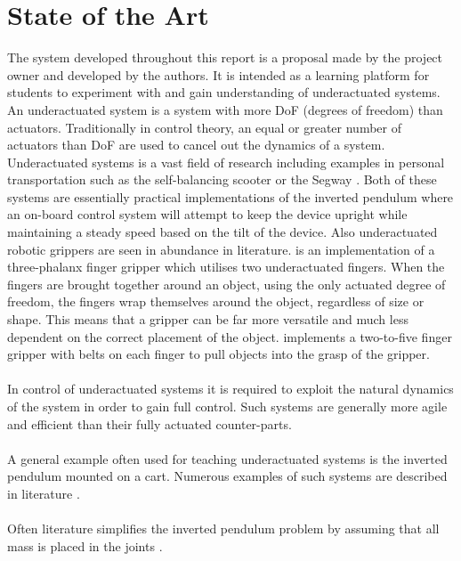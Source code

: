 \section{State of the Art}
The system developed throughout this report is a proposal made by the project owner and developed by the authors.
It is intended as a learning platform for students to experiment with and gain understanding of underactuated systems.
An underactuated system is a system with more DoF (degrees of freedom) than actuators.
Traditionally in control theory, an equal or greater number of actuators than DoF are used to cancel out the dynamics of a system.
Underactuated systems is a vast field of research including examples in personal transportation such as the self-balancing scooter \cite{scooter} or the Segway \cite{segway}.
Both of these systems are essentially practical implementations of the inverted pendulum where an on-board control system will attempt to keep the device upright while maintaining a steady speed based on the tilt of the device.
Also underactuated robotic grippers are seen in abundance in literature. 
\cite{threegripper} is an implementation of a three-phalanx finger gripper which utilises two underactuated fingers.
When the fingers are brought together around an object, using the only actuated degree of freedom, the fingers wrap themselves around the object, regardless of size or shape.
This means that a gripper can be far more versatile and much less dependent on the correct placement of the object. 
\cite{pullgripper} implements a two-to-five finger gripper with belts on each finger to pull objects into the grasp of the gripper.
\\~\\
In control of underactuated systems it is required to exploit the natural dynamics of the system \cite{mitunderactuated} in order to gain full control.
Such systems are generally more agile and efficient than their fully actuated counter-parts.
\\~\\
A general example often used for teaching underactuated systems is the inverted pendulum mounted on a cart.
Numerous examples of such systems are described in literature \cite{invertpendulum1} \cite{tripleinvertpendulum} \cite{invertpendulum3} \cite{doubleinvertpendulum}.
\\~\\
Often literature simplifies the inverted pendulum problem by assuming that all mass is placed in the joints \cite{doubleinvertpendulum}.


